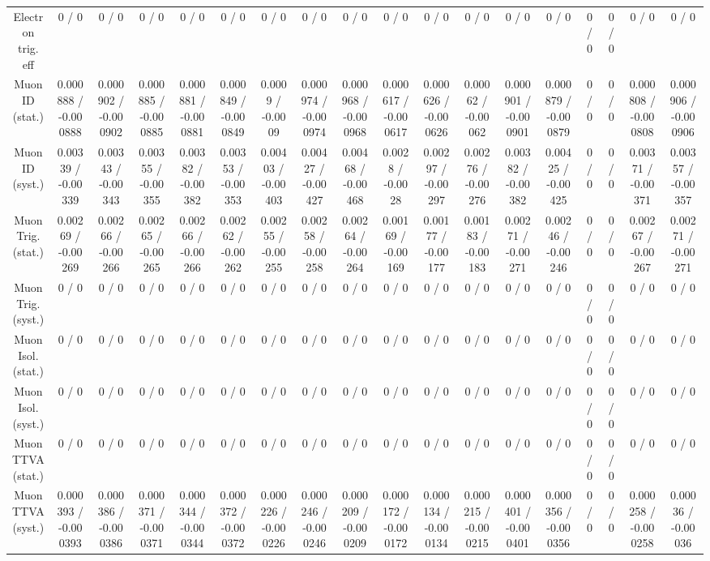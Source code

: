 \documentclass[10pt]{article}
\begin{document}
\begin{table}[htbp]
\begin{center}
\begin{tabular}{|c|c|c|c|c|c|c|c|c|c|c|c|c|c|c|c|c|c|}
  Electron trig. eff & 0 / 0 & 0 / 0 & 0 / 0 & 0 / 0 & 0 / 0 & 0 / 0 & 0 / 0 & 0 / 0 & 0 / 0 & 0 / 0 & 0 / 0 & 0 / 0 & 0 / 0 & 0 / 0 & 0 / 0 & 0 / 0 & 0 / 0 \\ 
  Muon ID (stat.) & 0.000888 / -0.000888 & 0.000902 / -0.000902 & 0.000885 / -0.000885 & 0.000881 / -0.000881 & 0.000849 / -0.000849 & 0.0009 / -0.0009 & 0.000974 / -0.000974 & 0.000968 / -0.000968 & 0.000617 / -0.000617 & 0.000626 / -0.000626 & 0.00062 / -0.00062 & 0.000901 / -0.000901 & 0.000879 / -0.000879 & 0 / 0 & 0 / 0 & 0.000808 / -0.000808 & 0.000906 / -0.000906 \\ 
  Muon ID (syst.) & 0.00339 / -0.00339 & 0.00343 / -0.00343 & 0.00355 / -0.00355 & 0.00382 / -0.00382 & 0.00353 / -0.00353 & 0.00403 / -0.00403 & 0.00427 / -0.00427 & 0.00468 / -0.00468 & 0.0028 / -0.0028 & 0.00297 / -0.00297 & 0.00276 / -0.00276 & 0.00382 / -0.00382 & 0.00425 / -0.00425 & 0 / 0 & 0 / 0 & 0.00371 / -0.00371 & 0.00357 / -0.00357 \\ 
  Muon Trig. (stat.) & 0.00269 / -0.00269 & 0.00266 / -0.00266 & 0.00265 / -0.00265 & 0.00266 / -0.00266 & 0.00262 / -0.00262 & 0.00255 / -0.00255 & 0.00258 / -0.00258 & 0.00264 / -0.00264 & 0.00169 / -0.00169 & 0.00177 / -0.00177 & 0.00183 / -0.00183 & 0.00271 / -0.00271 & 0.00246 / -0.00246 & 0 / 0 & 0 / 0 & 0.00267 / -0.00267 & 0.00271 / -0.00271 \\ 
  Muon Trig. (syst.) & 0 / 0 & 0 / 0 & 0 / 0 & 0 / 0 & 0 / 0 & 0 / 0 & 0 / 0 & 0 / 0 & 0 / 0 & 0 / 0 & 0 / 0 & 0 / 0 & 0 / 0 & 0 / 0 & 0 / 0 & 0 / 0 & 0 / 0 \\ 
  Muon Isol. (stat.) & 0 / 0 & 0 / 0 & 0 / 0 & 0 / 0 & 0 / 0 & 0 / 0 & 0 / 0 & 0 / 0 & 0 / 0 & 0 / 0 & 0 / 0 & 0 / 0 & 0 / 0 & 0 / 0 & 0 / 0 & 0 / 0 & 0 / 0 \\ 
  Muon Isol. (syst.) & 0 / 0 & 0 / 0 & 0 / 0 & 0 / 0 & 0 / 0 & 0 / 0 & 0 / 0 & 0 / 0 & 0 / 0 & 0 / 0 & 0 / 0 & 0 / 0 & 0 / 0 & 0 / 0 & 0 / 0 & 0 / 0 & 0 / 0 \\ 
  Muon TTVA (stat.) & 0 / 0 & 0 / 0 & 0 / 0 & 0 / 0 & 0 / 0 & 0 / 0 & 0 / 0 & 0 / 0 & 0 / 0 & 0 / 0 & 0 / 0 & 0 / 0 & 0 / 0 & 0 / 0 & 0 / 0 & 0 / 0 & 0 / 0 \\ 
  Muon TTVA (syst.) & 0.000393 / -0.000393 & 0.000386 / -0.000386 & 0.000371 / -0.000371 & 0.000344 / -0.000344 & 0.000372 / -0.000372 & 0.000226 / -0.000226 & 0.000246 / -0.000246 & 0.000209 / -0.000209 & 0.000172 / -0.000172 & 0.000134 / -0.000134 & 0.000215 / -0.000215 & 0.000401 / -0.000401 & 0.000356 / -0.000356 & 0 / 0 & 0 / 0 & 0.000258 / -0.000258 & 0.00036 / -0.00036 \\ 

\end{tabular}
\end{center}
\end{table}
\end{document}
